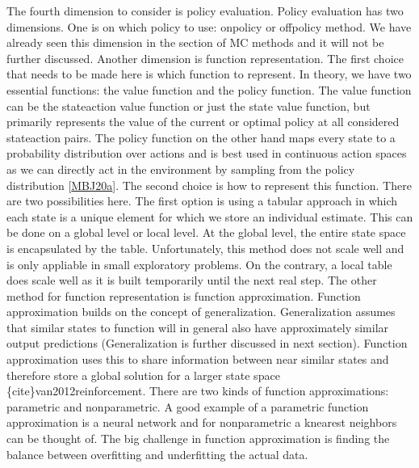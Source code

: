 \documentclass[letterpaper,10pt,english]{jupyterBook}
\begin{document}
\sphinxAtStartPar
The fourth dimension to consider is policy evaluation. Policy evaluation has two dimensions. One is on which policy to use: on\sphinxhyphen{}policy or off\sphinxhyphen{}policy method. We have already seen this dimension in the section of MC methods and it will not be further discussed. Another dimension is function representation. The first choice that needs to be made here is which function to represent. In theory, we have two essential functions: the value function and the policy function. The value function can be the state\sphinxhyphen{}action value function or just the state value function, but primarily represents the value of the current or optimal policy at all considered state\sphinxhyphen{}action pairs. The policy function on the other hand maps every state to a probability distribution over actions and is best used in continuous action spaces as we can directly act in the environment by sampling from the policy distribution {[}\hyperlink{cite.Discussion:id7}{MBJ20a}{]}. The second choice is how to represent this function. There are two possibilities here. The first option is using a tabular approach in which each state is a unique element for which we store an individual estimate.  This can be done on a global level or local level. At the global level, the entire state space is encapsulated by the table. Unfortunately, this method does not scale well and is only appliable in small exploratory problems. On the contrary, a local table does scale well as it is built temporarily until the next real step. The other method for function representation is function approximation. Function approximation builds on the concept of generalization. Generalization assumes that similar states to function will in general also have approximately similar output predictions (Generalization is further discussed in next section).  Function approximation uses this to share information between near similar states and therefore store a global solution for a larger state space \{cite\}van2012reinforcement. There are two kinds of function approximations: parametric and non\sphinxhyphen{}parametric. A good example of a parametric function approximation is a neural network and for non\sphinxhyphen{}parametric a k\sphinxhyphen{}nearest neighbors can be thought of. The big challenge in function approximation is finding the balance between overfitting and underfitting the actual data.
\end{document}
